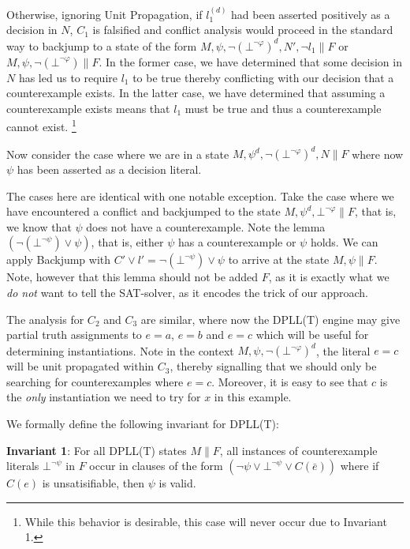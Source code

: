 \documentclass{llncs}
\begin{document}
Otherwise, ignoring Unit Propagation, if $l_1^{(d)}$ had been asserted positively as a decision in $N$, $C_1$ is falsified and conflict analysis would proceed in the standard way to backjump to a state of the form $M, \psi, \neg( \bot^{\neg \varphi} )^d, N', \neg l_1 \parallel F$ or $M, \psi, \neg( \bot^{\neg \varphi} )  \parallel F$.
In the former case, we have determined that some decision in $N$ has led us to require $l_1$ to be true thereby conflicting with our decision that a counterexample exists.
In the latter case, we have determined that assuming a counterexample exists means that $l_1$ must be true and thus a counterexample cannot exist.
\footnote{ While this behavior is desirable, this case will never occur due to Invariant 1.}

Now consider the case where we are in a state $M, \psi^d, \neg( \bot^{\neg \varphi} )^d, N  \parallel F$ where now $\psi$ has been asserted as a decision literal.

The cases here are identical with one notable exception.
Take the case where we have encountered a conflict and backjumped to the state $M, \psi^d, \bot^{\neg \varphi} \parallel F$, that is, we know that $\psi$ does not have a counterexample.
Note the lemma $(\neg (\bot^{\neg \psi}) \vee \psi)$, that is, either $\psi$ has a counterexample or $\psi$ holds.
We can apply Backjump with $C' \vee l' = \neg (\bot^{\neg \psi}) \vee \psi$ to arrive at the state $M, \psi \parallel F$.
Note, however that this lemma should not be added $F$, as it is exactly what we \emph{do not} want to tell the SAT-solver, as it encodes the trick of our approach.

The analysis for $C_2$ and $C_3$ are similar, where now the DPLL(T) engine may give partial truth assignments to $e = a$, $e = b$ and $e = c$ which will be useful for determining instantiations.
Note in the context $M, \psi, \neg( \bot^{\neg \varphi} )^d$, the literal $e = c$ will be unit propagated within $C_3$, thereby signalling that we should only be searching for counterexamples where $e = c$.
Moreover, it is easy to see that $c$ is the \emph{only} instantiation we need to try for $x$ in this example.

We formally define the following invariant for DPLL(T):

{\bf Invariant 1}:
For all DPLL(T) states $M \parallel F$, all instances of counterexample literals $\bot^{\neg \psi}$ in $F$ occur in clauses of the form $( \neg \psi \vee \bot^{\neg \psi} \vee C(\bar{e}) )$ where if $C(e)$ is unsatisifiable, then $\psi$ is valid. \\
\end{document}
